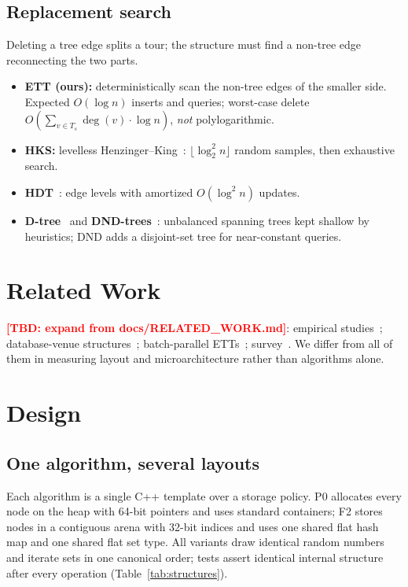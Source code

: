 \documentclass[conference]{IEEEtran}
\newcommand{\TBD}[1]{\textcolor{red}{\textbf{[TBD: #1]}}}
\begin{document}
\subsection{Replacement search}
Deleting a tree edge splits a tour; the structure must find a non-tree edge reconnecting the two parts.
\begin{itemize}
\item \textbf{ETT (ours):} deterministically scan the non-tree edges of the smaller side. Expected $O(\log n)$ inserts and queries; worst-case delete $O(\sum_{v\in T_s}\deg(v)\cdot\log n)$, \emph{not} polylogarithmic.
\item \textbf{HKS:} levelless Henzinger--King~\cite{alberts1997}: $\lfloor\log_2^2 n\rfloor$ random samples, then exhaustive search.
\item \textbf{HDT}~\cite{holm2001}: edge levels with amortized $O(\log^2 n)$ updates.
\item \textbf{D-tree}~\cite{chen2022dtree} and \textbf{DND-trees}~\cite{xu2024}: unbalanced spanning trees kept shallow by heuristics; DND adds a disjoint-set tree for near-constant queries.
\end{itemize}

\section{Related Work}
\TBD{expand from docs/RELATED\_WORK.md}: empirical studies~\cite{alberts1997,iyer2001,chen2025}; database-venue structures~\cite{chen2022dtree,xu2024}; batch-parallel ETTs~\cite{tseng2019}; survey~\cite{hanauer2022}. We differ from all of them in measuring layout and microarchitecture rather than algorithms alone.

\section{Design}
\subsection{One algorithm, several layouts}
Each algorithm is a single C++ template over a storage policy. P0 allocates every node on the heap with 64-bit pointers and uses standard containers; F2 stores nodes in a contiguous arena with 32-bit indices and uses one shared flat hash map and one shared flat set type. All variants draw identical random numbers and iterate sets in one canonical order; tests assert identical internal structure after every operation (Table~\ref{tab:structures}).
\end{document}
